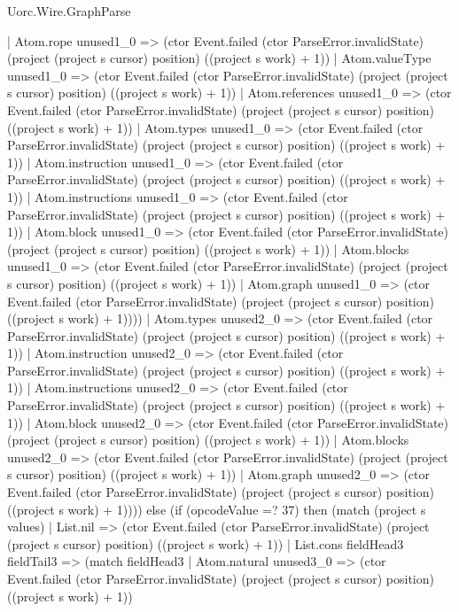 \begin{lexlean}{Uorc.Wire.GraphParse}
\begin{semanticmodule}
{              | Atom.rope unused1_0 => (ctor Event.failed (ctor ParseError.invalidState) (project (project s cursor) position) ((project s work) + 1))
              | Atom.valueType unused1_0 => (ctor Event.failed (ctor ParseError.invalidState) (project (project s cursor) position) ((project s work) + 1))
              | Atom.references unused1_0 => (ctor Event.failed (ctor ParseError.invalidState) (project (project s cursor) position) ((project s work) + 1))
              | Atom.types unused1_0 => (ctor Event.failed (ctor ParseError.invalidState) (project (project s cursor) position) ((project s work) + 1))
              | Atom.instruction unused1_0 => (ctor Event.failed (ctor ParseError.invalidState) (project (project s cursor) position) ((project s work) + 1))
              | Atom.instructions unused1_0 => (ctor Event.failed (ctor ParseError.invalidState) (project (project s cursor) position) ((project s work) + 1))
              | Atom.block unused1_0 => (ctor Event.failed (ctor ParseError.invalidState) (project (project s cursor) position) ((project s work) + 1))
              | Atom.blocks unused1_0 => (ctor Event.failed (ctor ParseError.invalidState) (project (project s cursor) position) ((project s work) + 1))
              | Atom.graph unused1_0 => (ctor Event.failed (ctor ParseError.invalidState) (project (project s cursor) position) ((project s work) + 1))))
          | Atom.types unused2_0 => (ctor Event.failed (ctor ParseError.invalidState) (project (project s cursor) position) ((project s work) + 1))
          | Atom.instruction unused2_0 => (ctor Event.failed (ctor ParseError.invalidState) (project (project s cursor) position) ((project s work) + 1))
          | Atom.instructions unused2_0 => (ctor Event.failed (ctor ParseError.invalidState) (project (project s cursor) position) ((project s work) + 1))
          | Atom.block unused2_0 => (ctor Event.failed (ctor ParseError.invalidState) (project (project s cursor) position) ((project s work) + 1))
          | Atom.blocks unused2_0 => (ctor Event.failed (ctor ParseError.invalidState) (project (project s cursor) position) ((project s work) + 1))
          | Atom.graph unused2_0 => (ctor Event.failed (ctor ParseError.invalidState) (project (project s cursor) position) ((project s work) + 1)))) else (if (opcodeValue =? 37) then (match (project s values)
        | List.nil => (ctor Event.failed (ctor ParseError.invalidState) (project (project s cursor) position) ((project s work) + 1))
        | List.cons fieldHead3 fieldTail3 => (match fieldHead3
          | Atom.natural unused3_0 => (ctor Event.failed (ctor ParseError.invalidState) (project (project s cursor) position) ((project s work) + 1))
}
\end{semanticmodule}
\end{lexlean}
